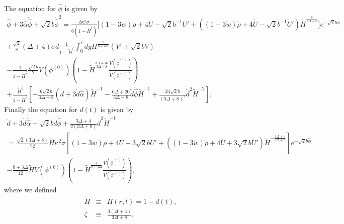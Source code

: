 \documentclass[a4paper,11pt]{article}
\begin{document}
The equation for $\hat{\phi}$ is given by 
\begin{multline}
\ddot{\hat{\phi}}+3\dot{\hat{\alpha}}\dot{\hat{\phi}}
+\sqrt{2}b\dot{\hat{\phi}}^2  
= \frac{b\kappa^2 \sigma}{6(1-\tilde{H}^{\zeta})} 
\Big[
(1-3w)\rho+4 U- \sqrt{2} b^{-1}U' 
+ ((1-3\tilde{w})\tilde{\rho}+4 \tilde{U}-\sqrt{2} b^{-1} \tilde{U}')
\tilde{H}^{\frac{8}{3\Delta +8}}
\Big]
e^{-\sqrt{2}b\hat{\phi}}  \\
+\frac{\sqrt{2}}{8}(\Delta+4) \sigma d
\frac{1}{1-\tilde{H}^{\zeta}} \int^r_0 dy H^{\frac{8}{8+3 \Delta}}
\left(V'+\sqrt{2} b V \right) \\
- \frac{1}{1-\tilde{H}^{\zeta}}
\frac{\sqrt{2}b}{2} V(\phi^{(0)})\left(1- \tilde{H}^{\frac{3 \Delta+16}{3 \Delta +8}} 
\frac{V(\tilde{\phi}^{(0)})}{V(\phi^{(0)})} \right)\\
+\frac{\tilde{H}^{\zeta}}{1-\tilde{H}^{\zeta}}
\left[
-\frac{6\sqrt{2}b}{3\Delta +8}
(\ddot{d}+3\dot{d}\dot{\hat{\alpha}})\tilde{H}^{-1}
 -\frac{6\Delta +20}{3\Delta +8}
  \dot{d}\dot{\hat{\phi}}\tilde{H}^{-1}
 +\frac{24\sqrt{2}b}{(3\Delta +8)^2} \dot{d}^2 \tilde{H}^{-2}
\right].
\label{eq:scalar} 
\end{multline}
Finally the equation for $d(t)$ is given by  
\begin{multline}
\ddot{d}+3\dot{d}\dot{\hat{\alpha}}+\sqrt{2}b\dot{d}\dot{\hat{\phi}}
+\frac{3\Delta +4}{2(3\Delta +8)}\dot{d}^2 \tilde{H}^{-1}  \\
=\frac{\sqrt{2}(3\Delta +8)}{72}\tilde{H} \kappa^2 \sigma
\left[
(1-3w)\rho +4U+3 \sqrt{2}b U'
+((1-3\tilde{w})\tilde{\rho}+4 \tilde{U}+3 \sqrt{2} b \tilde{U}')
\tilde{H}^{-\frac{3\Delta +4}{3\Delta +8}}
\right]e^{-\sqrt{2}b \hat{\phi}}\\
-\frac{8+3 \Delta}{12} \tilde{H}V(\phi^{(0)}) \left(1- 
\tilde{H}^{\frac{4}{8+3 \Delta}} 
\frac{V(\tilde{\phi}^{(0)})}{V(\phi^{(0)})} \right)
, 
\label{eq:rad}
\end{multline}
where we defined 
\begin{eqnarray}
\tilde{H} &\equiv& H(r,t) = 1-d(t), \\
\zeta &\equiv& \frac{3(\Delta + 4)}{3\Delta +8}.
\end{eqnarray}
\end{document}
